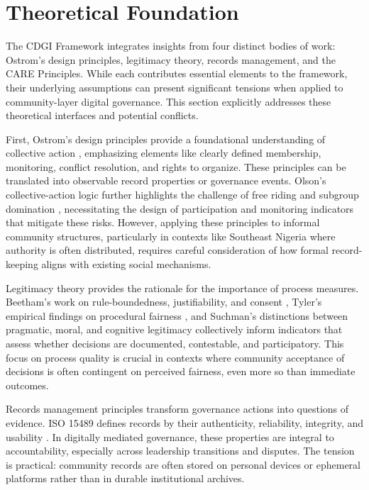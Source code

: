 \documentclass[sigconf]{acmart}
\begin{document}
\section{Theoretical Foundation}

The CDGI Framework integrates insights from four distinct bodies of work: Ostrom’s design principles, legitimacy theory, records management, and the CARE Principles. While each contributes essential elements to the framework, their underlying assumptions can present significant tensions when applied to community-layer digital governance. This section explicitly addresses these theoretical interfaces and potential conflicts.

First, Ostrom’s design principles provide a foundational understanding of collective action \cite{ostrom1990}, emphasizing elements like clearly defined membership, monitoring, conflict resolution, and rights to organize. These principles can be translated into observable record properties or governance events. Olson’s collective-action logic further highlights the challenge of free riding and subgroup domination \cite{olson1965}, necessitating the design of participation and monitoring indicators that mitigate these risks. However, applying these principles to informal community structures, particularly in contexts like Southeast Nigeria where authority is often distributed, requires careful consideration of how formal record-keeping aligns with existing social mechanisms.

Legitimacy theory provides the rationale for the importance of process measures. Beetham’s work on rule-boundedness, justifiability, and consent \cite{beetham2013}, Tyler’s empirical findings on procedural fairness \cite{tyler2006}, and Suchman’s distinctions between pragmatic, moral, and cognitive legitimacy \cite{suchman1995} collectively inform indicators that assess whether decisions are documented, contestable, and participatory. This focus on process quality is crucial in contexts where community acceptance of decisions is often contingent on perceived fairness, even more so than immediate outcomes.

Records management principles transform governance actions into questions of evidence. ISO 15489 defines records by their authenticity, reliability, integrity, and usability \cite{iso2016}. In digitally mediated governance, these properties are integral to accountability, especially across leadership transitions and disputes. The tension is practical: community records are often stored on personal devices or ephemeral platforms rather than in durable institutional archives.
\end{document}
